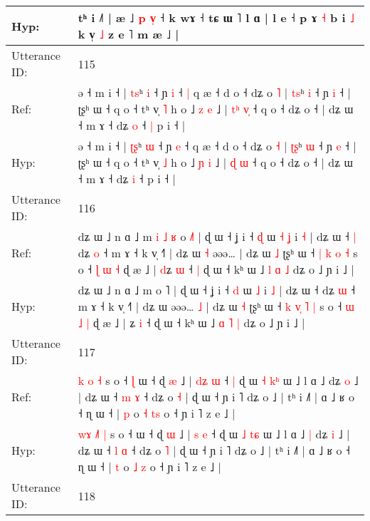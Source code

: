 \documentclass[10pt]{article}
\DeclareRobustCommand{\hl}[1]{{\textcolor{red}{#1}}}
\begin{document}
\begin{longtable}{ll}
 \\
Hyp: & tʰ i ˩˥ | æ\hl{} ˩ \hl{p} \hl{v}\hl{̩} ˧ k wɤ ˧ tɕ ɯ ˥ l ɑ\hl{}\hl{} | l e ˧\hl{}\hl{}\hl{}\hl{}\hl{}\hl{} p ɤ\hl{}\hl{} \hl{˧} b i \hl{˩} k v̩ \hl{˩} z e ˥ m æ ˩ |
 \\
\midrule
Utterance ID: & 115 \\
Ref: & ə ˧ m i ˧ | \hl{t}\hl{s}ʰ \hl{i} ˧ ɲ \hl{i} ˧\hl{ }\hl{|} q æ ˧ d o ˧ dʑ o \hl{˥} | \hl{t}\hl{s}ʰ \hl{i} ˧ ɲ \hl{i} ˧ | ʈʂʰ ɯ ˧ q o ˧ tʰ v̩ \hl{˥} h o ˩ \hl{z} \hl{e} ˩ | \hl{t}\hl{ʰ} \hl{v}\hl{̩} ˧ q o ˧ dʑ o ˧ | dʑ ɯ ˧ m ɤ ˧ dʑ \hl{o} ˧\hl{ }\hl{|} p i ˧ |
 \\
Hyp: & ə ˧ m i ˧ | \hl{ʈ}\hl{ʂ}ʰ \hl{ɯ} ˧ ɲ \hl{e} ˧\hl{}\hl{} q æ ˧ d o ˧ dʑ o \hl{˧} | \hl{ʈ}\hl{ʂ}ʰ \hl{ɯ} ˧ ɲ \hl{e} ˧ | ʈʂʰ ɯ ˧ q o ˧ tʰ v̩ \hl{˩} h o ˩ \hl{ɲ} \hl{i} ˩ | \hl{}\hl{ɖ} \hl{}\hl{ɯ} ˧ q o ˧ dʑ o ˧ | dʑ ɯ ˧ m ɤ ˧ dʑ \hl{i} ˧\hl{}\hl{} p i ˧ |
 \\
\midrule
Utterance ID: & 116 \\
Ref: & dʑ ɯ ˩ n ɑ ˩ m\hl{ }\hl{i}\hl{ }\hl{˩}\hl{ }\hl{ʁ} o \hl{˩}˥ | ɖ ɯ ˧ ʝ i ˧ \hl{ɖ} ɯ\hl{ }\hl{˧} \hl{ʝ} i \hl{˧} | dʑ ɯ ˧\hl{ }\hl{|} dʑ \hl{o} ˧ m ɤ ˧ k v̩ ˧˥ | dʑ ɯ\hl{ }\hl{˧} əəə…\hl{}\hl{} | dʑ ɯ \hl{˩} ʈʂʰ ɯ ˧ \hl{|} \hl{}\hl{k} \hl{o} \hl{˧} s o ˧ \hl{ɭ} \hl{ɯ} \hl{˧} ɖ æ ˩ | \hl{d}ʑ \hl{ɯ} ˧\hl{ }\hl{|} ɖ ɯ ˧ kʰ ɯ ˩ \hl{l} \hl{ɑ} \hl{˩} dʑ o ˩ ɲ i ˩ |
 \\
Hyp: & dʑ ɯ ˩ n ɑ ˩ m\hl{}\hl{}\hl{}\hl{}\hl{}\hl{} o \hl{}˥ | ɖ ɯ ˧ ʝ i ˧ \hl{d} ɯ\hl{}\hl{} \hl{˩} i \hl{˩} | dʑ ɯ ˧\hl{}\hl{} dʑ \hl{ɯ} ˧ m ɤ ˧ k v̩ ˧˥ | dʑ ɯ\hl{}\hl{} əəə…\hl{ }\hl{˩} | dʑ ɯ \hl{˧} ʈʂʰ ɯ ˧ \hl{k} \hl{v}\hl{̩} \hl{˥} \hl{|} s o ˧ \hl{ɯ} \hl{˩} \hl{|} ɖ æ ˩ | \hl{}ʑ \hl{i} ˧\hl{}\hl{} ɖ ɯ ˧ kʰ ɯ ˩ \hl{ɑ} \hl{˥} \hl{|} dʑ o ˩ ɲ i ˩ |
 \\
\midrule
Utterance ID: & 117 \\
Ref: & \hl{}\hl{k} \hl{}\hl{o} \hl{˧} s o ˧\hl{ }\hl{ɭ} ɯ ˧ ɖ \hl{æ} ˩ | \hl{d}\hl{ʑ} \hl{ɯ} ˧\hl{ }\hl{|} ɖ ɯ \hl{˧} \hl{k}\hl{ʰ} ɯ ˩ l ɑ ˩\hl{}\hl{} dʑ \hl{o} ˩ | dʑ ɯ ˧ \hl{m} \hl{ɤ} ˧ dʑ o \hl{˧} | ɖ ɯ ˧ ɲ i ˥ dʑ o ˩ | tʰ i ˩˥ | ɑ ˩ ʁ o ˧ ɳ ɯ ˧ | \hl{p} o \hl{˧} \hl{t}\hl{s} o ˧ ɲ i ˥ z e ˩ |
 \\
Hyp: & \hl{w}\hl{ɤ} \hl{˩}\hl{˥} \hl{|} s o ˧\hl{}\hl{} ɯ ˧ ɖ \hl{ɯ} ˩ | \hl{}\hl{s} \hl{e} ˧\hl{}\hl{} ɖ ɯ \hl{˩} \hl{t}\hl{ɕ} ɯ ˩ l ɑ ˩\hl{ }\hl{|} dʑ \hl{i} ˩ | dʑ ɯ ˧ \hl{l} \hl{ɑ} ˧ dʑ o \hl{˥} | ɖ ɯ ˧ ɲ i ˥ dʑ o ˩ | tʰ i ˩˥ | ɑ ˩ ʁ o ˧ ɳ ɯ ˧ | \hl{t} o \hl{˩} \hl{}\hl{z} o ˧ ɲ i ˥ z e ˩ |
 \\
\midrule
Utterance ID: & 118 \\

\end{longtable}
\end{document}
